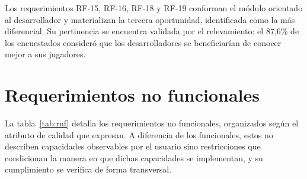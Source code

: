 Los requerimientos RF-15, RF-16, RF-18 y RF-19 conforman el módulo orientado al desarrollador y materializan la tercera oportunidad, identificada como la más diferencial. Su pertinencia se encuentra validada por el relevamiento: el 87,6\% de los encuestados consideró que los desarrolladores se beneficiarían de conocer mejor a sus jugadores.

\section{Requerimientos no funcionales}\label{sec:rnf}

La tabla~\ref{tab:rnf} detalla los requerimientos no funcionales, organizados según el atributo de calidad que expresan. A diferencia de los funcionales, estos no describen capacidades observables por el usuario sino restricciones que condicionan la manera en que dichas capacidades se implementan, y su cumplimiento se verifica de forma transversal.

